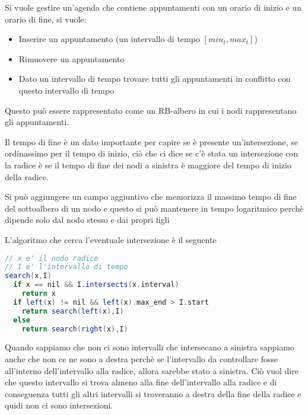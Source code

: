 \documentclass[a4paper]{article}
\begin{document}
\begin{exercise}
  Si vuole gestire un'agenda che contiene appuntamenti con un orario di inizio e un orario
  di fine, si vuole:
  \begin{itemize}
    \item Inserire un appuntamento (un intervallo di tempo \( \left[ min_t, max_t \right] \))
    \item Rimuovere un appuntamento
    \item Dato un intervallo di tempo trovare tutti gli appuntamenti in conflitto con
      questo intervallo di tempo 
  \end{itemize}
  Questo può essere rappresentato come un RB-albero in cui i nodi rappresentano gli
  appuntamenti.

  \vspace{1em}
  \noindent
  Il tempo di fine è un dato importante per capire se è presente un'intersezione,
  se ordinassimo per il tempo di inizio, ciò che ci dice se c'è stata un intersezione
  con la radice è se il tempo di fine dei nodi a sinistra è maggiore del tempo di 
  inizio della radice.

  \vspace{1em}
  \noindent
  Si può aggiungere un campo aggiuntivo che memorizza il massimo tempo di fine del
  sottoalbero di un nodo
  e questo si può mantenere in tempo logaritmico perchè dipende solo dal nodo stesso
  e dai propri figli

  \vspace{1em}
  \noindent
  L'algoritmo che cerca l'eventuale intersezione è il seguente
\begin{lstlisting}[language=Scala]
// x e' il nodo radice
// I e' l'intervallo di tempo
search(x,I)
  if x == nil && I.intersects(x.interval)
    return x
  if left(x) != nil && left(x).max_end > I.start
    return search(left(x),I)
  else
    return search(right(x),I)
\end{lstlisting}
  Quando sappiamo che non ci sono intervalli che intersecano a sinistra sappiamo
  anche che non ce ne sono a destra perchè se l'intervallo da controllare fosse
  all'interno dell'intervallo alla radice, allora sarebbe stato a sinistra.
  Ciò vuol dire che questo intervallo si trova almeno alla fine dell'intervallo alla
  radice e di conseguenza tutti gli altri intervalli si troveranno a destra della fine
  della radice e quidi non ci sono intersezioni.
\end{exercise}
\end{document}
